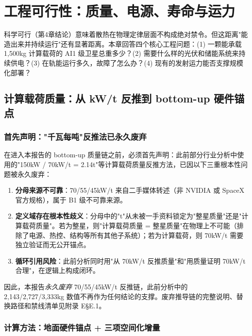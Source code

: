 
\section{工程可行性：质量、电源、寿命与运力}

科学可行（第4章结论）意味着散热在物理定律层面不构成绝对禁令。但这距离"能造出来并持续运行"还有显著距离。本章回答四个核心工程问题：(1) 一颗能承载 1,500\;kg 计算载荷的 AI1 级卫星总重多少？(2) 需要什么样的光伏和储能系统来持续供电？(3) 在轨能运行多久，故障了怎么办？(4) 现有的发射运力能否支撑规模化部署？

\subsection{计算载荷质量：从 kW/t 反推到 bottom-up 硬件锚点}

\subsubsection{首先声明："千瓦每吨"反推法已永久废弃}

在进入本报告的 bottom-up 质量链之前，必须首先声明：此前部分行业分析中使用的"150\;kW / 70\;kW/t = 2.14\;t"等计算载荷质量反推方法，已因以下三重根本性问题被永久废弃：

\begin{enumerate}
    \item \textbf{分母来源不可靠}：70/55/45\;kW/t 来自二手媒体转述（非 NVIDIA 或 SpaceX 官方规格），属于 B1 级不可靠来源。
    \item \textbf{定义域存在根本性歧义}：分母中的"t"从未被一手资料锁定为"整星质量"还是"计算载荷质量"。若为整星，则"计算载荷质量 = 整星质量"在物理上不可能（排除了电源、热控、结构等所有其他子系统）；若为计算载荷，则 70\;kW/t 需要独立验证而无公开锚点。
    \item \textbf{循环引用风险}：此前分析同时用"从 70\;kW/t 反推质量"和"用质量证明 70\;kW/t 合理"，在逻辑上构成闭环。
\end{enumerate}

因此，本报告\emph{永久废弃} 70/55/45\;kW/t 反推链，此前分析中的 2,143/2,727/3,333\;kg 数值不再作为任何结论的支撑。废弃推导链的完整说明、替换路径和禁线清单见附录 E\;\S E.1。

\subsubsection{计算方法：地面硬件锚点 + 三项空间化增量}

